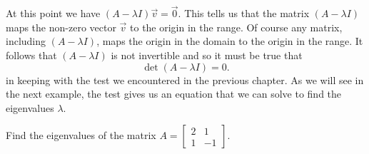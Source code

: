 \documentclass[../book.tex]{subfiles}
\begin{document}
At this point we have \((A - \lambda I)  \vec{v} = \vec{0}\). This tells us that the matrix \((A - \lambda I)\) maps the non-zero vector \(\vec{v}\) to the origin in the range. Of course any matrix, including \((A - \lambda I)\), maps the origin in the domain to the origin in the range. It follows that \((A - \lambda I)\) is not invertible and so it must be true that
\begin{equation}\label{eq:eig-7}
\det (A - \lambda I) = 0.
\end{equation}
in keeping with the test we encountered in the previous chapter. As we will see in the next example, the test  gives us an equation that we can solve to find the eigenvalues \(\lambda\).

\begin{example} \label{eg:eigen1}
Find the eigenvalues of the matrix \(A = \begin{bmatrix} 2 & 1 \\ 1 & -1\end{bmatrix}\).
\end{example}
\end{document}
